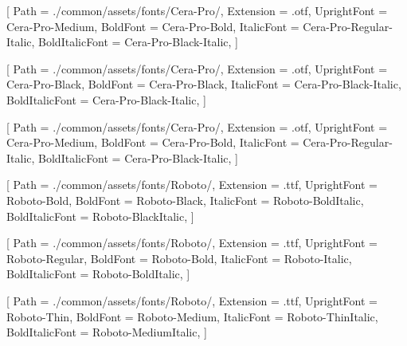 
\contourlength{0.8pt}

\renewcommand{\ULdepth}{3.8pt}

\setmainfont{Cera-Pro-Medium}[
Path = ./common/assets/fonts/Cera-Pro/,
Extension = .otf,
UprightFont = Cera-Pro-Medium,
BoldFont = Cera-Pro-Bold,
ItalicFont = Cera-Pro-Regular-Italic,
BoldItalicFont = Cera-Pro-Black-Italic,
]


[
Path = ./common/assets/fonts/Cera-Pro/,
Extension = .otf,
UprightFont = Cera-Pro-Black,
BoldFont = Cera-Pro-Black,
ItalicFont = Cera-Pro-Black-Italic,
BoldItalicFont = Cera-Pro-Black-Italic,
]

[
Path = ./common/assets/fonts/Cera-Pro/,
Extension = .otf,
UprightFont = Cera-Pro-Medium,
BoldFont = Cera-Pro-Bold,
ItalicFont = Cera-Pro-Regular-Italic,
BoldItalicFont = Cera-Pro-Black-Italic,
]

[
Path = ./common/assets/fonts/Roboto/,
Extension = .ttf,
UprightFont = Roboto-Bold,
BoldFont = Roboto-Black,
ItalicFont = Roboto-BoldItalic,
BoldItalicFont = Roboto-BlackItalic,
]

[
Path = ./common/assets/fonts/Roboto/,
Extension = .ttf,
UprightFont = Roboto-Regular,
BoldFont = Roboto-Bold,
ItalicFont = Roboto-Italic,
BoldItalicFont = Roboto-BoldItalic,
]

[
Path = ./common/assets/fonts/Roboto/,
Extension = .ttf,
UprightFont = Roboto-Thin,
BoldFont = Roboto-Medium,
ItalicFont = Roboto-ThinItalic,
BoldItalicFont = Roboto-MediumItalic,
]